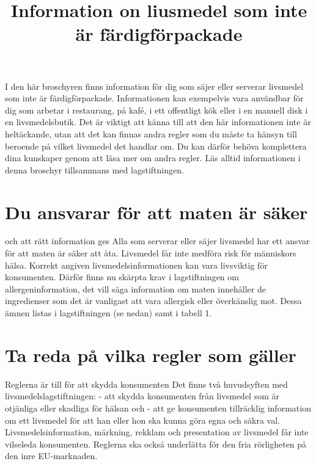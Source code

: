 \title{
Information on liusmedel som inte är färdigförpackade
}


I den här broschyren finns information för dig som säjer eller serverar livsmedel som inte är färdigförpackade. Informationen kan exempelvis vara användbar för dig som arbetar i restaurang, på kafé, i ett offentligt kök eller i en manuell disk i en livsmedelsbutik. Det är viktigt att känna till att den här informationen inte är heltäckande, utan att det kan finnas andra regler som du måste ta hänsyn till beroende på vilket livsmedel det handlar om.
Du kan därför behöva komplettera dina kunskaper genom att läsa mer om andra regler. Läs alltid informationen i denna broschyr tillsammans med lagstiftningen.
\section*{Du ansvarar för att maten är säker} och att rätt information ges
Alla som serverar eller säjer livsmedel har ett ansvar för att maten är säker att åta. Livsmedel får inte medföra risk för människors hälsa.
Korrekt angiven livsmedelsinformationen kan vara livsviktig för konsumenten. Därför finns nu skärpta krav i lagstiftningen om allergeninformation, det vill säga information om maten innehåller de ingredienser som det är vanligast att vara allergisk eller överkänslig mot. Dessa ämnen listas i lagstiftningen (se nedan) samt i tabell 1.
\section*{Ta reda på vilka regler som gäller}
Reglerna är till för att skydda konsumenten Det finns två huvudsyften med livsmedelslagstiftningen:
- att skydda konsumenten från livsmedel som är otjänliga eller skadliga för hälsan och
- att ge konsumenten tillräcklig information om ett livsmedel för att han eller hon ska kunna göra egna och säkra val. Livsmedelsinformation, märkning, rekklam och presentation av livsmedel får inte vilseleda konsumenten.
Reglerna ska också underlätta för den fria rörligheten på den inre EU-marknaden.
